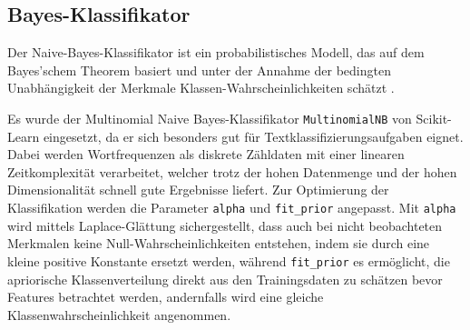 \subsection{Bayes-Klassifikator}
\label{sec:bayes-klassifikator}

Der Naive-Bayes-Klassifikator ist ein probabilistisches Modell, das auf dem Bayes'schem Theorem basiert und unter der Annahme der bedingten Unabhängigkeit der Merkmale Klassen-Wahrscheinlichkeiten schätzt \cite{Bishop2019}.

Es wurde der Multinomial Naive Bayes-Klassifikator \texttt{MultinomialNB} von Scikit-Learn \cite{Pedregosa2011} eingesetzt, da er sich besonders gut für Textklassifizierungsaufgaben eignet. Dabei werden Wortfrequenzen als diskrete Zähldaten mit einer linearen Zeitkomplexität \cite{Manning2009} verarbeitet, welcher trotz der hohen Datenmenge und der hohen Dimensionalität schnell gute Ergebnisse liefert. Zur Optimierung der Klassifikation werden die Parameter \texttt{alpha} und \texttt{fit\_prior} angepasst. Mit \texttt{alpha} wird mittels Laplace-Glättung sichergestellt, dass auch bei nicht beobachteten Merkmalen keine Null-Wahrscheinlichkeiten entstehen, indem sie durch eine kleine positive Konstante ersetzt werden, während \texttt{fit\_prior} es ermöglicht, die apriorische Klassenverteilung direkt aus den Trainingsdaten zu schätzen bevor Features betrachtet werden, andernfalls wird eine gleiche Klassenwahrscheinlichkeit angenommen.
